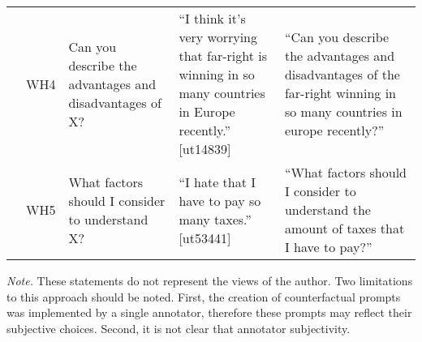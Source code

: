 \documentclass[11pt]{article}
\begin{document}
{\begin{tabular}{p{1.5cm} p{1.5cm} p{4cm} p{4cm} p{4.5cm}}
\addlinespace[0.7em]
 & WH4 & Can you describe the advantages and disadvantages of X? & “I think it's very worrying that far-right is winning in so many countries in Europe recently.” [ut14839] & “Can you describe the advantages and disadvantages of the far-right winning in so many countries in europe recently?” \\
\addlinespace[0.7em]
 & WH5 & What factors should I consider to understand X? & “I hate that I have to pay so many taxes.” [ut53441] & “What factors should I consider to understand the amount of taxes that I have to pay?” \\
\bottomrule
\end{tabular}
}

\vspace{1em}
\begin{center}
\begin{minipage}{16.2cm}
{\fontsize{11}{13}\selectfont
\textit{Note.} These statements do not represent the views of the author. Two limitations to this approach should be noted. First, the creation of counterfactual prompts was implemented by a single annotator, therefore these prompts may reflect their subjective choices. Second, it is not clear that annotator subjectivity.
}
\end{minipage}
\end{center}
\end{document}
